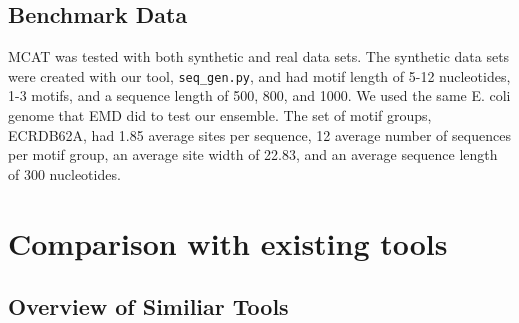 \documentclass[12pt]{article}
\newenvironment{SLOPPY}{\begin{sloppypar}\hbadness=10000}{\end{sloppypar}}
\begin{document}
\subsection{Benchmark Data} 
\begin{SLOPPY} 
MCAT was tested with both synthetic and real data sets. The synthetic data sets were 
created with our tool, \verb|seq_gen.py|, and had motif length of 5-12 nucleotides, 
1-3 motifs, and a sequence length of 500, 800, and 1000. We used the same E. coli 
genome that EMD did to test our ensemble. The set of motif groups, ECRDB62A, had 
1.85 average sites per sequence, 12 average number of sequences per motif group, 
an average site width of 
22.83, and an average sequence length of 300 nucleotides. 
\\ 
\end{SLOPPY}

\section{Comparison with existing tools}
\label{section:comparison}

\noindent
\subsection{Overview of Similiar Tools}
\end{document}
